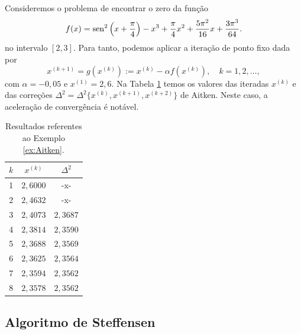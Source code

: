 \begin{ex}\label{ex:Aitken}
  Consideremos o problema de encontrar o zero da função
  \begin{equation}
    f(x) = \operatorname{sen}^2\left(x+\frac{\pi}{4}\right) - x^3 + \frac{\pi}{4}x^2 + \frac{5\pi^2}{16}x + \frac{3\pi^3}{64}.
  \end{equation}
  no intervalo $[2,3]$. Para tanto, podemos aplicar a iteração de ponto fixo dada por
  \begin{equation}
    x^{(k+1)} = g(x^{(k)}) := x^{(k)} - \alpha f(x^{(k)}),\quad k=1,2,\ldots,
  \end{equation}
com $\alpha=-0,05$ e $x^{(1)}=2,6$. Na Tabela \ref{tab:ex_Aitken} temos os valores das iteradas $x^{(k)}$ e das correções $\Delta^2 = \Delta^2\{x^{(k)},x^{(k+1)},x^{(k+2)}\}$ de Aitken. Neste caso, a aceleração de convergência é notável.

\begin{table}[h!]
  \centering
  \caption{Resultados referentes ao Exemplo \ref{ex:Aitken}.}
  \label{tab:ex_Aitken}
  \begin{tabular}{r|cc}
    $k$ & $x^{(k)}$ & $\Delta^2$ \\\hline
    1 & $2,6000$ & -x- \\
    2 & $2,4632$ & -x- \\
    3 & $2,4073$ & $2,3687$ \\
    4 & $2,3814$ & $2,3590$ \\
    5 & $2,3688$ & $2,3569$ \\
    6 & $2,3625$ & $2,3564$ \\
    7 & $2,3594$ & $2,3562$ \\
    8 & $2,3578$ & $2,3562$ \\\hline
  \end{tabular}
\end{table}

% 
\end{ex}

\subsection{Algoritmo de Steffensen}

